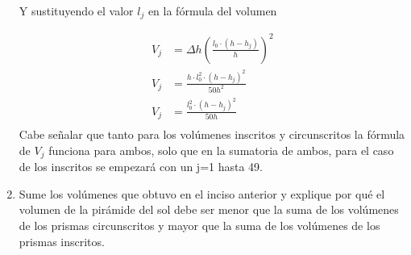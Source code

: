 \documentclass[12pt]{article}
\begin{document}
\begin{enumerate}
        Y sustituyendo el valor $l_j$ en la fórmula del volumen
    
        \begin{align*}
            V_j &= \Delta h \left( \frac{l_0 \cdot (h - h_j)}{h} \right)^2\\
            V_j &=   \frac{h \cdot l_0^2 \cdot (h - h_j)^2}{50 h^2} \\
            V_j &=   \frac{l_0^2 \cdot (h - h_j)^2}{50 h}\\
        \end{align*}
        Cabe señalar que tanto para los volúmenes inscritos y circunscritos la fórmula de $V_j$ funciona para ambos, solo que en la sumatoria de ambos, para el caso de los inscritos se empezará con un j=1 hasta 49.

    \item Sume los volúmenes que obtuvo en el inciso anterior y explique por qué el volumen de la pirámide del sol debe ser menor que la suma de los volúmenes de los prismas circunscritos y mayor que la suma de los volúmenes de los prismas inscritos.
     

\end{enumerate}
\end{document}
